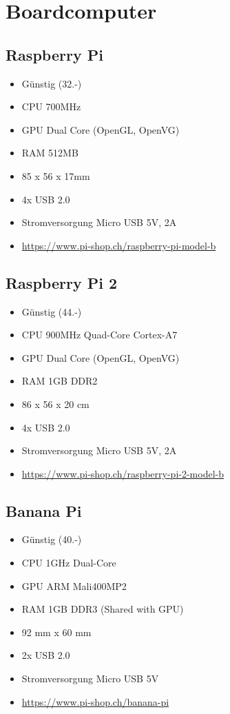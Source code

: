 \section{Boardcomputer}

\subsection{Raspberry Pi}
\begin{itemize}
\item Günstig (32.-)
\item CPU 700MHz
\item GPU Dual Core (OpenGL, OpenVG)
\item RAM 512MB
\item 85 x 56 x 17mm
\item 4x USB 2.0
\item Stromversorgung Micro USB 5V, 2A
\item \url{https://www.pi-shop.ch/raspberry-pi-model-b}
\end{itemize}

\subsection{Raspberry Pi 2}
\begin{itemize}
\item Günstig (44.-)
\item CPU 900MHz Quad-Core Cortex-A7
\item GPU Dual Core (OpenGL, OpenVG)
\item RAM 1GB DDR2
\item 86 x 56 x 20 cm
\item 4x USB 2.0
\item Stromversorgung Micro USB 5V, 2A
\item \url{https://www.pi-shop.ch/raspberry-pi-2-model-b}
\end{itemize}

\subsection{Banana Pi}
\begin{itemize}
\item Günstig (40.-)
\item CPU 1GHz Dual-Core
\item GPU ARM Mali400MP2
\item RAM 1GB DDR3 (Shared with GPU)
\item 92 mm x 60 mm
\item 2x USB 2.0
\item Stromversorgung Micro USB 5V
\item \url{https://www.pi-shop.ch/banana-pi}
\end{itemize}

